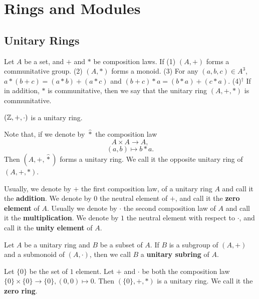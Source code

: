 \chapter{Rings and Modules}
\section{Unitary Rings}
\begin{definitionenv}
    Let $A$ be a set,  and $+$ and $*$ be composition laws. If 
    \newline
    (1) $(A, +)$ forms a communitative group.
    \newline
    (2) $(A, *)$ forms a monoid.
    \newline
    (3) For any $(a, b, c)\in A^3$,  $a*(b+c)=(a*b)+(a*c)$ and $(b+c)*a=(b*a)+(c*a)$.
    \newline
    (4)$^\dagger$ If in addition,  $*$ is communitative,  then we say that the unitary ring $(A, +, *)$ is communitative.
\end{definitionenv}
\begin{exampleenv}
    $(\mathbb{Z}, +, \cdot)$ is a unitary ring.
\end{exampleenv}
Note that,  if we denote by $\hat{*}$ the composition law 
$$A\times A\longrightarrow A, $$
$$(a, b)\longmapsto b*a.$$
Then $(A, +, \hat{*})$ forms a unitary ring. We call it the opposite unitary ring of $(A, +, *)$.
\begin{notationenv}
    Usually,  we denote by $+$ the first composition law,  of a unitary ring $A$ and call it the \textbf{addition}. We denote by $0$ the neutral element of $+$,  and call it the \textbf{zero element} of $A$. Usually we denote by $\cdot$ the second composition law of $A$ and call it the \textbf{multiplication}. We denote by $1$ the neutral element with respect to $\cdot$,  and call it the \textbf{unity element} of $A$.
\end{notationenv}
\begin{definitionenv}
    Let $A$ be a unitary ring and $B$ be a subset of $A$. If $B$ is a subgroup of $(A, +)$ and a submonoid of $(A, \cdot)$,  then we call $B$ a \textbf{unitary subring} of $A$.
\end{definitionenv}
\begin{exampleenv}
    Let $\{0\}$ be the set of $1$ element. Let $+$ and $\cdot$ be both the composition law $\{0\}\times\{0\}\rightarrow\{0\}, (0, 0)\mapsto0$. Then $(\{0\}, +, *)$ is a unitary ring. We call it the \textbf{zero ring}.
\end{exampleenv}

